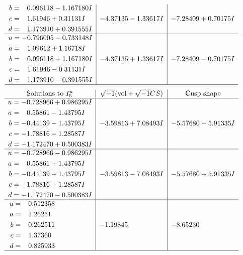 \documentclass[1p]{elsarticle_modified}
\theoremstyle{definition}
\newcommand{\I}{\sqrt{-1}}
\begin{document}
$$\begin{array}{c|c|c}
\begin{aligned}
b &= \phantom{-}0.096118 - 1.167180 I \\
c &= \phantom{-}1.61946 + 0.31131 I \\
d &= \phantom{-}1.173910 + 0.391555 I\end{aligned}
 & -4.37135 - 1.33617 I & -7.28409 + 0.70175 I \\ \hline\begin{aligned}
u &= -0.796005 - 0.733148 I \\
a &= \phantom{-}1.09612 + 1.16718 I \\
b &= \phantom{-}0.096118 + 1.167180 I \\
c &= \phantom{-}1.61946 - 0.31131 I \\
d &= \phantom{-}1.173910 - 0.391555 I\end{aligned}
 & -4.37135 + 1.33617 I & -7.28409 - 0.70175 I\\
 \hline 
 \end{array}$$\newpage$$\begin{array}{c|c|c}  
\text{Solutions to }I^u_{5}& \I (\text{vol} + \sqrt{-1}CS) & \text{Cusp shape}\\
 \hline 
\begin{aligned}
u &= -0.728966 + 0.986295 I \\
a &= \phantom{-}0.55861 - 1.43795 I \\
b &= -0.44139 - 1.43795 I \\
c &= -1.78816 - 1.28587 I \\
d &= -1.172470 + 0.500383 I\end{aligned}
 & -3.59813 + 7.08493 I & -5.57680 - 5.91335 I \\ \hline\begin{aligned}
u &= -0.728966 - 0.986295 I \\
a &= \phantom{-}0.55861 + 1.43795 I \\
b &= -0.44139 + 1.43795 I \\
c &= -1.78816 + 1.28587 I \\
d &= -1.172470 - 0.500383 I\end{aligned}
 & -3.59813 - 7.08493 I & -5.57680 + 5.91335 I \\ \hline\begin{aligned}
u &= \phantom{-}0.512358\phantom{ +0.000000I} \\
a &= \phantom{-}1.26251\phantom{ +0.000000I} \\
b &= \phantom{-}0.262511\phantom{ +0.000000I} \\
c &= \phantom{-}1.37360\phantom{ +0.000000I} \\
d &= \phantom{-}0.825933\phantom{ +0.000000I}\end{aligned}
 & -1.19845\phantom{ +0.000000I} & -8.65230\phantom{ +0.000000I}\\
 \hline 
 \end{array}$$\newpage\newpage\renewcommand{\arraystretch}{1}
\end{document}

